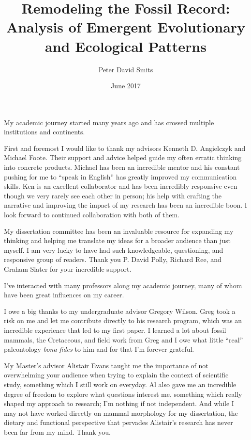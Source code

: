 \documentclass{ucetd}  %
\title{Remodeling the Fossil Record: \protect\\Analysis of Emergent Evolutionary and Ecological Patterns}
\author{Peter David Smits}
\date{June 2017}
\begin{document}
\maketitle

\makecopyright
\makededication
\makeepigraph


\tableofcontents
\listoffigures
\listoftables

\acknowledgments
My academic journey started many years ago and has crossed multiple institutions and continents. 

First and foremost I would like to thank my advisors Kenneth D. Angielczyk and Michael Foote. Their support and advice helped guide my often erratic thinking into concrete products. Michael has been an incredible mentor and his constant pushing for me to ``speak in English'' has greatly improved my communication skills. Ken is an excellent collaborator and has been incredibly responsive even though we very rarely see each other in person; his help with crafting the narrative and improving the impact of my research has been an incredible boon. I look forward to continued collaboration with both of them.

My dissertation committee has been an invaluable resource for expanding my thinking and helping me translate my ideas for a broader audience than just myself. I am very lucky to have had such knowledgeable, questioning, and responsive group of readers. Thank you P. David Polly, Richard Ree, and Graham Slater for your incredible support. 

I've interacted with many professors along my academic journey, many of whom have been great influences on my career. 

I owe a big thanks to my undergraduate advisor Gregory Wilson. Greg took a risk on me and let me contribute directly to his research program, which was an incredible experience that led to my first paper. I learned a lot about fossil mammals, the Cretaceous, and field work from Greg and I owe what little ``real'' paleontology \textit{bona fides} to him and for that I'm forever grateful. 

My Master's advisor Alistair Evans taught me the importance of not overwhelming your audience when trying to explain the context of scientific study, something which I still work on everyday. Al also gave me an incredible degree of freedom to explore what questions interest me, something which really shaped my approach to research; I'm nothing if not independent. And while I may not have worked directly on mammal morphology for my dissertation, the dietary and functional perspective that pervades Alistair's research has never been far from my mind. Thank you.
\end{document}
